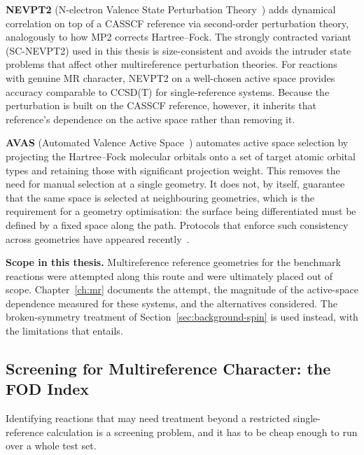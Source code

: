 \textbf{NEVPT2} (N-electron Valence State Perturbation Theory~\cite{angeli2001})
adds dynamical correlation on top of a CASSCF reference via second-order perturbation
theory, analogously to how MP2 corrects Hartree--Fock. The strongly contracted
variant (SC-NEVPT2) used in this thesis is size-consistent and avoids the intruder
state problems that affect other multireference perturbation theories. For reactions
with genuine MR character, NEVPT2 on a well-chosen active space provides accuracy
comparable to \mbox{CCSD(T)} for single-reference systems. Because the perturbation
is built on the CASSCF reference, however, it inherits that reference's dependence
on the active space rather than removing it.

\textbf{AVAS} (Automated Valence Active Space~\cite{sayfutyarova2017}) automates
active space selection by projecting the Hartree--Fock molecular orbitals onto a
set of target atomic orbital types and retaining those with significant projection
weight. This removes the need for manual selection at a single geometry. It does
not, by itself, guarantee that the same space is selected at neighbouring
geometries, which is the requirement for a geometry optimisation: the surface being
differentiated must be defined by a fixed space along the path. Protocols that
enforce such consistency across geometries have appeared
recently~\cite{seal2025wasp, bensberg2023}.

\textbf{Scope in this thesis.} Multireference reference geometries for the
benchmark reactions were attempted along this route and were ultimately placed out
of scope. Chapter~\ref{ch:mr} documents the attempt, the magnitude of the
active-space dependence measured for these systems, and the alternatives
considered. The broken-symmetry treatment of Section~\ref{sec:background-spin} is
used instead, with the limitations that entails.

\subsection{Screening for Multireference Character: the FOD Index}
\label{sec:background-mr-diagnostics}

Identifying reactions that may need treatment beyond a restricted single-reference
calculation is a screening problem, and it has to be cheap enough to run over a
whole test set.

